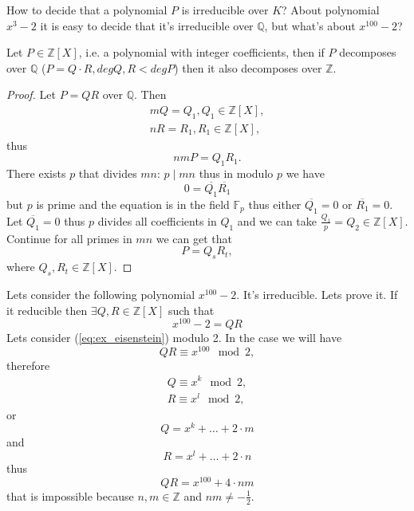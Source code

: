 How to decide that a polynomial $P$ is irreducible over $K$?
About polynomial $x^3 - 2$ it is easy to decide that it's irreducible
over $\mathbb{Q}$, but what's about $x^{100}-2$?

\begin{lemma}[Gauss]
  Let $P \in \mathbb{Z}\left[X\right]$, i.e. a polynomial with integer
  coefficients, then if $P$ decomposes over $\mathbb{Q}$ ($P = Q\cdot
  R, deg Q,R < deg P$) then it also decomposes over $\mathbb{Z}$.
  \begin{proof}
    Let $P = Q R$ over $\mathbb{Q}$. Then
    \begin{eqnarray}
      m Q = Q_1, Q_1 \in \mathbb{Z}\left[X\right],
      \nonumber \\
      n R = R_1, R_1 \in \mathbb{Z}\left[X\right],
      \nonumber
    \end{eqnarray}
    thus
    \[
    n m P = Q_1 R_1. 
    \]
    There exists $p$ that divides $mn$: $p \mid mn$ thus in modulo $p$
    we have
    \[
    0 = \overline{Q_1}\overline{R_1}
    \]
    but $p$ is prime and the equation is in the field $\mathbb{F}_p$
    thus either $\overline{Q_1} = 0$ or $\overline{R_1} = 0$. Let
    $\overline{Q_1} = 0$ thus $p$ divides all coefficients in $Q_1$
    and we can take $\frac{Q_1}{p} = Q_2 \in
    \mathbb{Z}\left[X\right]$. Continue for all primes in $mn$ we can
    get that
    \[
    P = Q_s R_t,
    \]
    where $Q_s, R_t \in \mathbb{Z}\left[X\right]$.
  \end{proof}
  \label{lem:gauss}
\end{lemma}

\begin{example}
  Lets consider the following polynomial $x^{100} -2$. It's
  irreducible. Lets prove it. If it reducible then
  $\exists Q, R \in \mathbb{Z}\left[X\right]$ such that
  \begin{equation}
    x^{100} -2 = Q R
    \label{eq:ex_eisenstein}
  \end{equation}
  Lets consider (\ref{eq:ex_eisenstein}) modulo 2. In the case we will
  have
  \[
  Q R \equiv x^{100} \mod 2,
  \]
  therefore
  \begin{eqnarray}
    Q \equiv x^k \mod 2,
    \nonumber \\
    R \equiv x^l \mod 2,
    \nonumber
  \end{eqnarray}
  or
  \[
  Q = x^k + \dots + 2 \cdot m
  \]
  and
  \[
  R = x^l + \dots + 2 \cdot n
  \]
  thus
  \[
  QR = x^{100} + 4 \cdot nm
  \]
  that is impossible because $n,m \in \mathbb{Z}$ and $nm \ne
  -\frac{1}{2}$. 
  \label{ex:eisenstein}
\end{example}

